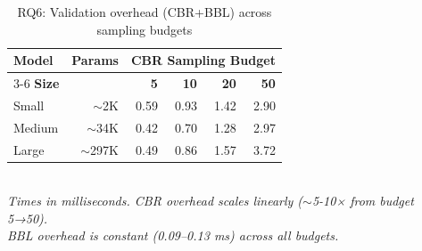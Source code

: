 \begin{table}[t]
\centering
\caption{RQ6: Validation overhead (CBR+BBL) across sampling budgets}
\label{tab:rq6-overhead-full}
\small
\setlength{\tabcolsep}{6pt}
\begin{tabular}{lrrrrr}
\toprule
\textbf{Model} & \textbf{Params} & \multicolumn{4}{c}{\textbf{CBR Sampling Budget}} \\
\cmidrule(lr){3-6}
\textbf{Size} & & \textbf{5} & \textbf{10} & \textbf{20} & \textbf{50} \\
\midrule
Small   & $\sim$2K   & 0.59 & 0.93 & 1.42 & 2.90 \\
Medium  & $\sim$34K  & 0.42 & 0.70 & 1.28 & 2.97 \\
Large   & $\sim$297K & 0.49 & 0.86 & 1.57 & 3.72 \\
\bottomrule
\end{tabular}
\vspace{1mm}\\
\footnotesize
\textit{Times in milliseconds. CBR overhead scales linearly ($\sim$5-10× from budget 5→50).}\\
\footnotesize
\textit{BBL overhead is constant (0.09--0.13 ms) across all budgets.}
\end{table}
